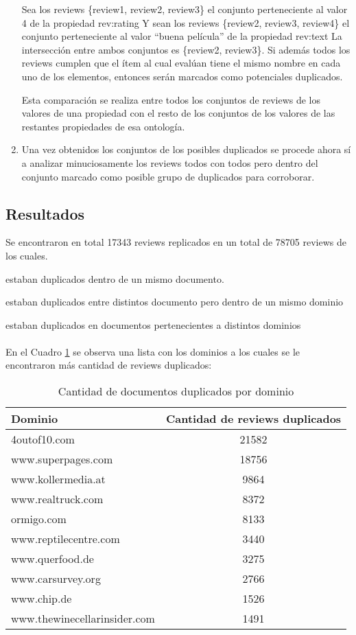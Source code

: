 \begin{enumerate}
Sea los reviews \{review1, review2, review3\} el conjunto perteneciente al valor 4 de la propiedad rev:rating 
Y sean los reviews \{review2, review3, review4\} el conjunto perteneciente al valor ``buena película'' de la propiedad rev:text 
La intersección entre ambos conjuntos es \{review2, review3\}. Si además todos los reviews cumplen que el ítem al cual evalúan 
tiene el mismo nombre en cada uno de los elementos, entonces serán marcados como potenciales duplicados.

Esta comparación se realiza entre todos los conjuntos de reviews de los valores de una propiedad con el resto de los conjuntos de los valores de las restantes propiedades de esa ontología.

\item Una vez obtenidos los conjuntos de los posibles duplicados se procede ahora sí a analizar minuciosamente los reviews todos con todos pero dentro del conjunto marcado como posible grupo de duplicados
para corroborar.
\end{enumerate}

\subsection*{Resultados}

Se encontraron en total 17343 reviews replicados en un total de 78705 reviews de los cuales.

 estaban duplicados dentro de un mismo documento.

 estaban duplicados entre distintos documento pero dentro de un mismo dominio

 estaban duplicados en documentos pertenecientes a distintos dominios
\\\\
En el Cuadro \ref{table:DominioDup} se observa una lista con los dominios a los cuales se le encontraron más cantidad de reviews duplicados:
\begin{table}[h]
\begin{tabular}{| l | c | }\hline
Dominio & Cantidad de reviews duplicados \\\hline
4outof10.com &	21582\\
www.superpages.com &	18756\\
www.kollermedia.at &	9864\\
www.realtruck.com &	8372\\
ormigo.com &	8133\\
www.reptilecentre.com &	3440\\
www.querfood.de &	3275\\
www.carsurvey.org &	2766\\
www.chip.de &	1526\\
www.thewinecellarinsider.com &	1491\\\hline
\end{tabular}
\caption{Cantidad de documentos duplicados por dominio}
\label{table:DominioDup}
\end{table}

